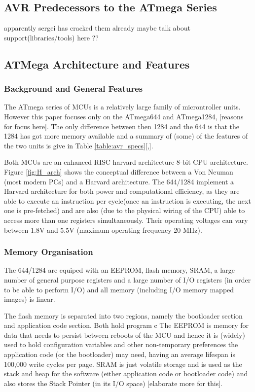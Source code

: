 \documentclass[12pt,a4paper,twocolumn]{article}
\begin{document}
	\subsection{AVR Predecessors to the ATmega Series}
	apparently sergei has cracked them already
	maybe talk about support(libraries/tools) here ?? \cite{website:scorobogatov_breaking_copy_protection}
	\subsection{ATMega Architecture and Features}
	\subsubsection{Background and General Features}
	The ATmega series of MCUs is a relatively large family of microntroller units. However this paper focuses only on the ATmega644 and ATmega1284, [reasons for focus here]. The only difference between then 1284 and the 644 is that the 1284 has got more memory available and a summary of (some) of the features of the two units is give in Table \ref{table:avr_specs}[\citep{atmega644_manual},\citep{atmega1284_manual}]. 
	
	Both MCUs are an enhanced RISC harvard architecture 8-bit CPU architecture. Figure \ref{fig:H_arch} shows the conceptual difference between a Von Neuman (most modern PCs) and a Harvard architecture. The 644/1284 implement a Harvard architecture for both power and computational efficiency, as they are able to execute an instruction per cycle(once an instruction is executing, the next one is pre-fetched) and are also (due to the physical wiring of the CPU) able to access more than one registers simultaneously. Their operating voltages can vary between 1.8V and 5.5V (maximum operating frequency 20 MHz).
	
	\subsubsection{Memory Organisation}
	The 644/1284 are equiped with an EEPROM, flash memory, SRAM, a large number of general purpose registers and a large number of I/O registers (in order to be able to perform I/O) and all memory (including I/O memory mapped images) is linear.
	
	The flash memory is separated into two regions, namely the bootloader section and application code section. Both hold program c
	The EEPROM is memory for data that needs to persist between reboots of the MCU and hence it is (widely) used to hold configuration variables and other non-temporary preferences the application code (or the bootloader) may need, having an average lifespan is 100,000 write cycles per page. SRAM is just volatile storage and is used as the stack and heap for the software (either application code or bootloader code) and also stores the Stack Pointer (in its I/O space) [elaborate more for this].
	
\end{document}
